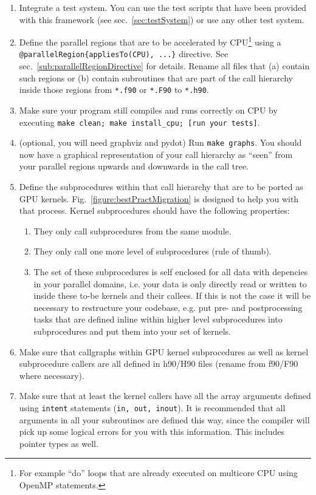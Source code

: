 \begin{enumerate}
 \item Integrate a test system. You can use the test scripts that have been provided with this framework (see sec.~\ref{sec:testSystem}) or use any other test system.
 \item Define the parallel regions that are to be accelerated by CPU\footnote{For example ``do'' loops that are already executed on multicore CPU using OpenMP statements.} using a \linebreak\verb|@parallelRegion{appliesTo(CPU), ...}| directive. See sec.~\ref{sub:parallelRegionDirective} for details. Rename all files that (a) contain such regions or (b) contain subroutines that are part of the call hierarchy inside those regions from \verb|*.f90| or \verb|*.F90| to \verb|*.h90|.
 \item Make sure your program still compiles and runs correctly on CPU by executing \verb|make clean; make install_cpu; [run your tests]|.
 \item (optional, you will need graphviz and pydot) Run \verb|make graphs|. You should now have a graphical representation of your call hierarchy as ``seen'' from your parallel regions upwards and downwards in the call tree.
 \item Define the subprocedures within that call hierarchy that are to be ported as GPU kernels. Fig.~\ref{figure:bestPractMigration} is designed to help you with that process. Kernel subprocedures should have the following properties:
  \begin{enumerate}
   \item They only call subprocedures from the same module.
   \item They only call one more level of subprocedures (rule of thumb).
   \item The set of these subprocedures is self enclosed for all data with depencies in your parallel domains, i.e. your data is only directly read or written to inside these to-be kernels and their callees. If this is not the case it will be necessary to restructure your codebase, e.g. put pre- and postprocessing tasks that are defined inline within higher level subprocedures into subprocedures and put them into your set of kernels.
  \end{enumerate}
 \item Make sure that callgraphs within GPU kernel subprocedures as well as kernel subprocedure callers are all defined in h90/H90 files (rename from f90/F90 where necessary).
 \item Make sure that at least the kernel callers have all the array arguments defined using \verb|intent| statements (\verb|in, out, inout|). It is recommended that all arguments in all your subroutines are defined this way, since the compiler will pick up some logical errors for you with this information. This includes pointer types as well.

\end{enumerate}
